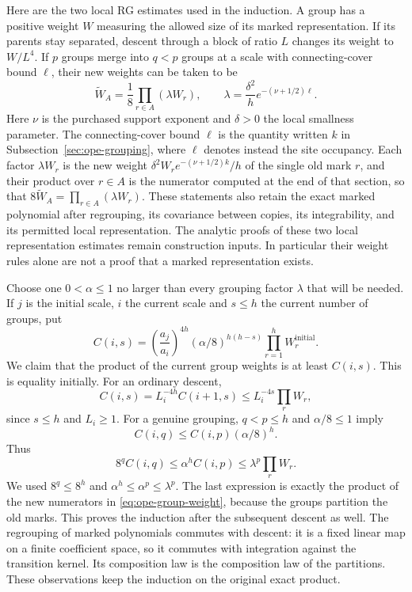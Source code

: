 Here are the two local RG estimates used in the induction. A group
has a positive weight $W$ measuring the allowed size of its marked
representation. If its parents stay separated, descent through a block
of ratio $L$ changes its weight to $W/L^4$. If $p$ groups merge into
$q<p$ groups at a scale with connecting-cover bound $\ell$, their
new weights can be taken to be
\begin{equation}\label{eq:ope-group-weight}
 \widetilde W_A=\frac18\prod_{r\in A}(\lambda W_r),\qquad
 \lambda=\frac{\delta^2}{h}
       e^{-(\nu+1/2)\ell}.
\end{equation}
Here $\nu$ is the purchased support exponent and $\delta>0$ the local
smallness parameter. The connecting-cover bound $\ell$ is the quantity
written $k$ in Subsection~\ref{sec:ope-grouping}, where $\ell$ denotes
instead the site occupancy. Each factor $\lambda W_r$ is the new weight
$\delta^2W_re^{-(\nu+1/2)k}/h$ of the single old mark $r$, and their
product over $r\in A$ is the numerator computed at the end of that
section, so that $8\widetilde W_A=\prod_{r\in A}(\lambda W_r)$. These statements also retain the exact marked
polynomial after regrouping, its covariance between copies, its
integrability, and its permitted local representation. The analytic
proofs of these two local representation estimates remain construction
inputs. In particular their weight rules alone are not a proof that
a marked representation exists.

Choose one $0<\alpha\leq1$ no larger than every grouping factor
$\lambda$ that will be needed. If $j$ is the initial scale, $i$ the
current scale and $s\leq h$ the current number of groups, put
\[
 C(i,s)=\left(\frac{a_j}{a_i}\right)^{4h}
         (\alpha/8)^{h(h-s)}\prod_{r=1}^h W_r^{\mathrm{initial}}.
\]
We claim that the product of the current group weights is at least
$C(i,s)$. This is equality initially. For an ordinary descent,
\[
 C(i,s)=L_i^{-4h}C(i+1,s)
 \leq L_i^{-4s}\prod_r W_r,
\]
since $s\leq h$ and $L_i\geq1$.
For a genuine grouping, $q<p\leq h$ and $\alpha/8\leq1$ imply
\[
 C(i,q)\leq C(i,p)(\alpha/8)^h.
\]
Thus
\[
 8^q C(i,q)\leq\alpha^h C(i,p)
       \leq\lambda^p\prod_r W_r.
\]
We used $8^q\leq8^h$ and $\alpha^h\leq\alpha^p\leq\lambda^p$.
The last expression is exactly the product of the new numerators
in \eqref{eq:ope-group-weight}, because the groups partition the
old marks. This proves the induction after the subsequent descent
as well. The regrouping of marked polynomials commutes with descent:
it is a fixed linear map on a finite coefficient space, so it commutes
with integration against the transition kernel. Its composition law
is the composition law of the partitions. These observations keep the
induction on the original exact product.

